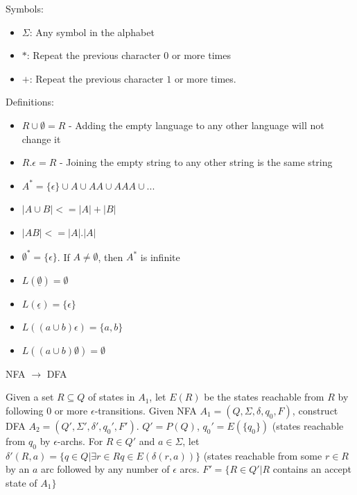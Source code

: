 \documentclass[2pt,legalpaper]{scrartcl}
\makeatletter
\renewcommand{\subsection}{\@startsection{subsection}{2}{0mm}
  {-1explus -.5ex minus -.2ex}
  {0.5ex plus .2ex}
{\normalfont\normalsize\bfseries}}
\makeatother
\begin{document}
\begin{multicols}{6}
  Symbols:
  \begin{itemize}
    \item $\Sigma$: Any symbol in the alphabet
    \item $*$: Repeat the previous character $0$ or more times
    \item $+$: Repeat the previous character $1$ or more times.
  \end{itemize}
  Definitions:
  \begin{multicols}{2}
    \begin{itemize}
      \item $R \cup \emptyset = R$ - Adding the empty language to any other language will not change it
      \item $R . \epsilon = R$ - Joining the empty string to any other string is the same string
      \item $A^* = \{\epsilon\} \cup A \cup AA \cup AAA \cup ...$
      \item $|A \cup B| <= |A| + |B|$
      \item $|AB| <= |A| . |A|$
      \item $\emptyset^* = \{\epsilon\}$. If $A \neq \emptyset$, then $A^*$ is infinite
      \item $L(\underline{\emptyset}) = \emptyset$
      \item $L(\underline{\epsilon}) = \{\epsilon\}$
      \item $L((a \cup b)\epsilon) = \{a, b\}$
      \item $L((a \cup b)\emptyset) = \emptyset$
    \end{itemize}
  \end{multicols}

  \subsection{NFA $\rightarrow$ DFA}

  Given a set $R \subseteq Q$ of states in $A_1$, let $E(R)$ be the states reachable from $R$ by following $0$ or more $\epsilon$-transitions. Given NFA $A_1 = (Q, \Sigma, \delta, q_0, F)$, construct DFA $A_2 = (Q', \Sigma', \delta', q_0', F')$. $Q' = P(Q)$, $q_0' = E(\{q_0\})$ (states reachable from $q_0$ by $\epsilon$-archs. For $R \in Q'$ and $a \in \Sigma$, let $\delta'(R, a) = \{q \in Q | \exists r \in R q \in E(\delta(r, a))\}$ (states reachable from some $r \in R$ by an $a$ arc followed by any number of $\epsilon$ arcs. $F' = \{R \in Q' | R$ contains an accept state of $A_1\}$


\end{multicols}
\end{document}
